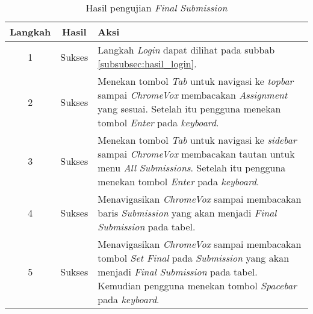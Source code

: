 \begin{table}[H]
	\centering
	\caption{Hasil pengujian \textit{Final Submission}}
	\label{tab:hasil_final_submission}
	\begin{tabular}{|c|c|p{12cm}|}
		\toprule
		Langkah & Hasil & Aksi\\
		\midrule
		1 & Sukses & Langkah \textit{Login} dapat dilihat pada subbab \ref{subsubsec:hasil_login}.\\
		2 & Sukses & Menekan tombol \textit{Tab} untuk navigasi ke \textit{topbar} sampai \textit{ChromeVox} membacakan \textit{Assignment} yang sesuai. Setelah itu pengguna menekan tombol \textit{Enter} pada \textit{keyboard}.\\
		3 & Sukses & Menekan tombol \textit{Tab} untuk navigasi ke \textit{sidebar} sampai \textit{ChromeVox} membacakan tautan untuk menu \textit{All Submissions}. Setelah itu pengguna menekan tombol \textit{Enter} pada \textit{keyboard}.\\
		4 & Sukses & Menavigasikan \textit{ChromeVox} sampai membacakan baris \textit{Submission} yang akan menjadi \textit{Final Submission} pada tabel.\\
		5 & Sukses & Menavigasikan \textit{ChromeVox} sampai membacakan tombol \textit{Set Final} pada \textit{Submission} yang akan menjadi \textit{Final Submission} pada tabel. Kemudian pengguna menekan tombol \textit{Spacebar} pada \textit{keyboard}.\\
		\bottomrule
	\end{tabular}
\end{table}
